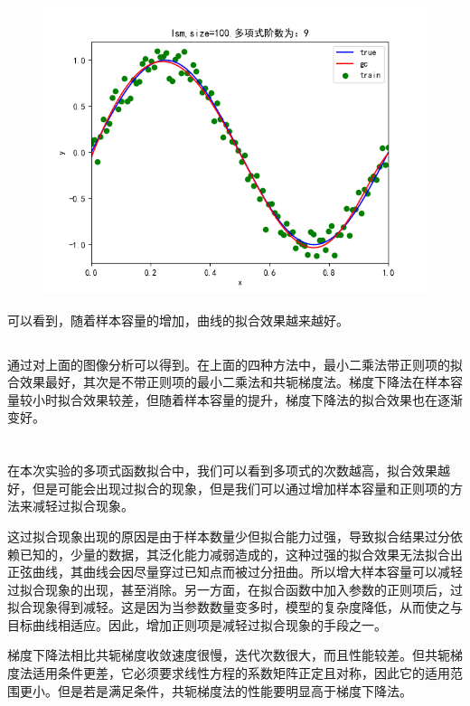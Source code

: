 \documentclass[lang=cn,a4paper,cite=authoryear]{elegantpaper}
\begin{document}
\begin{itemize}
\begin{figure}[H]
		\includegraphics[scale=0.5]{gc100}
	\end{figure}
	
\end{itemize}
可以看到，随着样本容量的增加，曲线的拟合效果越来越好。
\subsection*{}
通过对上面的图像分析可以得到。在上面的四种方法中，最小二乘法带正则项的拟合效果最好，其次是不带正则项的最小二乘法和共轭梯度法。梯度下降法在样本容量较小时拟合效果较差，但随着样本容量的提升，梯度下降法的拟合效果也在逐渐变好。
\section*{}
在本次实验的多项式函数拟合中，我们可以看到多项式的次数越高，拟合效果越好，但是可能会出现过拟合的现象，但是我们可以通过增加样本容量和正则项的方法来减轻过拟合现象。
\par 这过拟合现象出现的原因是由于样本数量少但拟合能力过强，导致拟合结果过分依赖已知的，少量的数据，其泛化能力减弱造成的，这种过强的拟合效果无法拟合出正弦曲线，其曲线会因尽量穿过已知点而被过分扭曲。所以增大样本容量可以减轻过拟合现象的出现，甚至消除。另一方面，在拟合函数中加入参数的正则项后，过拟合现象得到减轻。这是因为当参数数量变多时，模型的复杂度降低，从而使之与目标曲线相适应。因此，增加正则项是减轻过拟合现象的手段之一。

\par 梯度下降法相比共轭梯度收敛速度很慢，迭代次数很大，而且性能较差。但共轭梯度法适用条件更差，它必须要求线性方程的系数矩阵正定且对称，因此它的适用范围更小。但是若是满足条件，共轭梯度法的性能要明显高于梯度下降法。
\end{document}
